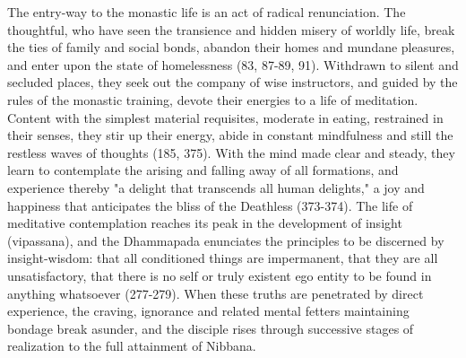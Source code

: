 \begin{enumerate}[i]
The entry-way to the monastic life is an act of radical renunciation. The thoughtful, who have seen the transience and hidden misery of worldly life, break the ties of family and social bonds, abandon their homes and mundane pleasures, and enter upon the state of homelessness (83, 87-89, 91). Withdrawn to silent and secluded places, they seek out the company of wise instructors, and guided by the rules of the monastic training, devote their energies to a life of meditation. Content with the simplest material requisites, moderate in eating, restrained in their senses, they stir up their energy, abide in constant mindfulness and still the restless waves of thoughts (185, 375). With the mind made clear and steady, they learn to contemplate the arising and falling away of all formations, and experience thereby "a delight that transcends all human delights," a joy and happiness that anticipates the bliss of the Deathless (373-374). The life of meditative contemplation reaches its peak in the development of insight (vipassana), and the Dhammapada enunciates the principles to be discerned by insight-wisdom: that all conditioned things are impermanent, that they are all unsatisfactory, that there is no self or truly existent ego entity to be found in anything whatsoever (277-279). When these truths are penetrated by direct experience, the craving, ignorance and related mental fetters maintaining bondage break asunder, and the disciple rises through successive stages of realization to the full attainment of Nibbana.


\end{enumerate}
